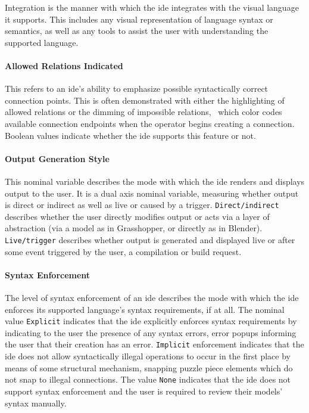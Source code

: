 Integration is the manner with which the \ac{ide} integrates with the visual
language it supports. This includes any visual representation of language
syntax or semantics, as well as any tools to assist the user with
understanding the supported language.


\paragraph{Allowed Relations Indicated}
This refers to an \ac{ide}'s ability to
emphasize possible syntactically correct connection points. This is often
demonstrated with either the highlighting of allowed relations or the
dimming of impossible relations, \eg \cameleon~which color codes available
connection endpoints when the operator begins creating a connection.
Boolean values indicate whether the \ac{ide} supports this feature or not.


\paragraph{Output Generation Style}
This nominal variable describes the
mode with which the \ac{ide} renders and displays output to the user. It is a
dual axis nominal variable, measuring whether output is direct or indirect
as well as live or caused by a trigger. \texttt{Direct/indirect} describes
whether the user directly modifies output or acts via a layer of
abstraction (\eg via a model as in Grasshopper, or directly as in Blender).
\texttt{Live/trigger} describes whether output is generated and displayed
live or after some event triggered by the user, \eg a compilation or build
request.


\paragraph{Syntax Enforcement}
The level of syntax enforcement of an \ac{ide} describes the mode with
which the \ac{ide} enforces its supported language's syntax requirements,
if at all. The nominal value \texttt{Explicit}
indicates that the \ac{ide} explicitly enforces syntax requirements by
indicating to the user the presence of any syntax errors, \eg error popups
informing the user that their creation has an error. \texttt{Implicit}
enforcement indicates that the \ac{ide} does not allow syntactically illegal
operations to occur in the first place by means of some structural
mechanism, \eg snapping puzzle piece elements which do not snap to illegal
connections. The value \texttt{None} indicates that the \ac{ide} does not
support syntax enforcement and the user is required to review their models'
syntax manually.


